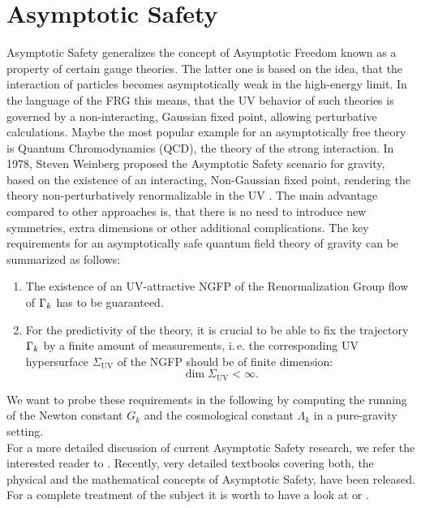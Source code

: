 \section{Asymptotic Safety}
Asymptotic Safety generalizes the concept of Asymptotic Freedom known as a property of certain gauge theories. The latter one is based on the idea, that the interaction of particles becomes asymptotically weak in the high-energy limit. In the language of the FRG this means, that the UV behavior of such theories is governed by a non-interacting, Gaussian fixed point,  allowing perturbative calculations. Maybe the most popular example for an asymptotically free theory is Quantum  Chromodynamics (QCD), the theory of the strong interaction. In 1978,  Steven Weinberg proposed the Asymptotic Safety scenario for gravity, based on the existence of an interacting, Non-Gaussian fixed point, rendering the theory non-perturbatively renormalizable in the UV \cite{Weinberg1980}. The main advantage compared to other approaches is, that there is no need to introduce new symmetries, extra dimensions or other additional complications. The key requirements for an asymptotically safe quantum field theory of gravity can be summarized as follows: 
\begin{enumerate}
	\item The existence of an UV-attractive NGFP of the Renormalization Group flow of $\Gamma_{k}$ has to be guaranteed. 
	\item For the predictivity of the theory, it is crucial to be able to fix the trajectory $\Gamma_{k}$ by a finite amount of measurements, i.\,e. the corresponding UV hypersurface $\Sigma_{\mathrm{UV}}$ of the NGFP should be of finite dimension: 
	\begin{equation*}
		\operatorname{dim}\Sigma_{\mathrm{UV}} < \infty.
	\end{equation*} 
\end{enumerate} 
We want to probe these requirements in the following by computing the running of the Newton constant $G_k$ and the cosmological constant $\Lambda_k$ in a pure-gravity setting. \\
For a more detailed discussion of current Asymptotic Safety research, we refer the interested reader to \cite{Eichhorn2018}. Recently, very detailed textbooks covering both, the physical and the mathematical concepts of Asymptotic Safety, have been released. For a complete treatment of the subject it is worth to have a look at \cite{Percacci2017} or \cite{ReuterSaueressig_2019}.
\vspace{-0.6cm}

